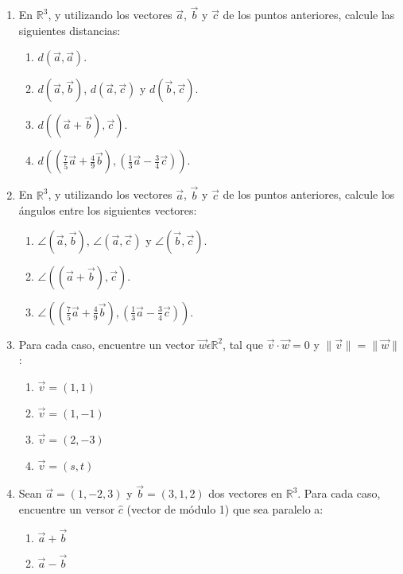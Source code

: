 \documentclass[a4paper,12pt]{article}
\begin{document}
\begin{enumerate}
  \item En $\mathbb R^3$, y utilizando los vectores $\vec a$, $\vec b$ y $\vec c$ de los puntos anteriores, calcule las siguientes distancias:
    \begin{enumerate}
      \item $d\left (\vec a, \vec a \right )$.
      \item $d\left (\vec a, \vec b \right )$, $d\left (\vec a, \vec c \right )$ y $d\left (\vec b, \vec c \right )$.
      \item $d\left ( \left ( \vec a + \vec b \right ), \vec c \right )$.
      \item $d\left ( \left ( \frac75 \vec a + \frac49 \vec b \right ), \left ( \frac13 \vec a - \frac34 \vec c \right )\right )$.
    \end{enumerate}
  \item En $\mathbb R^3$, y utilizando los vectores $\vec a$, $\vec b$ y $\vec c$ de los puntos anteriores, calcule los ángulos entre los siguientes vectores: 
    \begin{enumerate}
      \item $\angle \left (\vec a, \vec b \right )$, $\angle \left (\vec a, \vec c \right )$ y $\angle \left (\vec b, \vec c \right )$.
      \item $\angle \left ( \left ( \vec a + \vec b \right ), \vec c \right )$.
      \item $\angle \left ( \left ( \frac75 \vec a + \frac49 \vec b \right ), \left ( \frac13 \vec a - \frac34 \vec c \right )\right )$.
    \end{enumerate}
  \item Para cada caso, encuentre un vector $\vec w \epsilon \mathbb R^2$, tal que $\vec v \cdot \vec w = 0$ y $\| \vec v \| = \| \vec w \|$: 
    \begin{enumerate}
      \item $\vec v = (1,1)$
      \item $\vec v = (1,-1)$
      \item $\vec v = (2,-3)$
      \item $\vec v = (s,t)$
    \end{enumerate}
  \item Sean $\vec a=(1,-2,3)$ y $\vec b=(3,1,2)$ dos vectores en $\mathbb R^3$. Para cada caso, encuentre un versor $\hat c$ (vector de módulo 1) que sea paralelo a: 
    \begin{enumerate}
      \item $\vec a + \vec b$
      \item $\vec a - \vec b$

\end{enumerate}
\end{enumerate}
\end{document}
